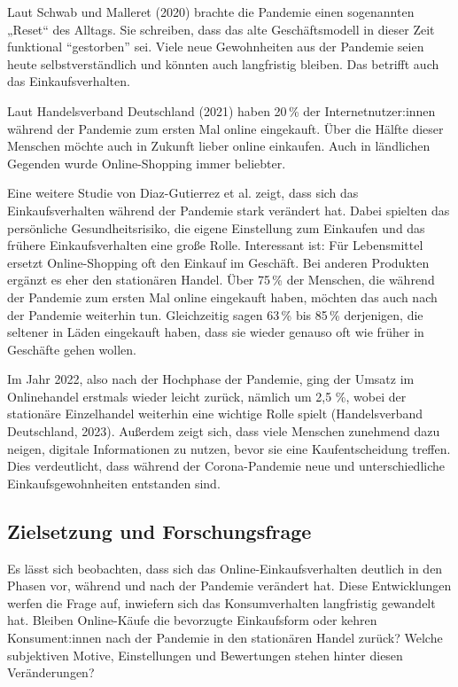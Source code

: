 Laut Schwab und Malleret (2020) brachte die Pandemie einen sogenannten „Reset“ des Alltags. Sie schreiben, dass das alte Geschäftsmodell in dieser Zeit funktional \enquote{gestorben} sei. Viele neue Gewohnheiten aus der Pandemie seien heute selbstverständlich und könnten auch langfristig bleiben. Das betrifft auch das Einkaufsverhalten. 

Laut Handelsverband Deutschland (2021) haben 20 \% der Internetnutzer:innen während der Pandemie zum ersten Mal online eingekauft. Über die Hälfte dieser Menschen möchte auch in Zukunft lieber online einkaufen. Auch in ländlichen Gegenden wurde Online-Shopping immer beliebter.

Eine weitere Studie von Diaz-Gutierrez et al.  zeigt, dass sich das Einkaufsverhalten während der Pandemie stark verändert hat. Dabei spielten das persönliche Gesundheitsrisiko, die eigene Einstellung zum Einkaufen und das frühere Einkaufsverhalten eine große Rolle. Interessant ist: Für Lebensmittel ersetzt Online-Shopping oft den Einkauf im Geschäft. Bei anderen Produkten ergänzt es eher den stationären Handel. Über 75 \% der Menschen, die während der Pandemie zum ersten Mal online eingekauft haben, möchten das auch nach der Pandemie weiterhin tun. Gleichzeitig sagen 63 \% bis 85 \% derjenigen, die seltener in Läden eingekauft haben, dass sie wieder genauso oft wie früher in Geschäfte gehen wollen. 

Im Jahr 2022, also nach der Hochphase der Pandemie, ging der Umsatz im Onlinehandel erstmals wieder leicht zurück, nämlich um 2,5 \%, wobei der stationäre Einzelhandel weiterhin eine wichtige Rolle spielt (Handelsverband Deutschland, 2023). Außerdem zeigt sich, dass viele Menschen zunehmend dazu neigen, digitale Informationen zu nutzen, bevor sie eine Kaufentscheidung treffen. Dies verdeutlicht, dass während der Corona-Pandemie neue und unterschiedliche Einkaufsgewohnheiten entstanden sind. 

\subsection{Zielsetzung und Forschungsfrage}
Es lässt sich beobachten, dass sich das Online-Einkaufsverhalten deutlich in den Phasen vor, während und nach der Pandemie verändert hat. Diese Entwicklungen werfen die Frage auf, inwiefern sich das Konsumverhalten langfristig gewandelt hat. Bleiben Online-Käufe die bevorzugte Einkaufsform oder kehren Konsument:innen nach der Pandemie in den stationären Handel zurück? Welche subjektiven Motive, Einstellungen und Bewertungen stehen hinter diesen Veränderungen? 

